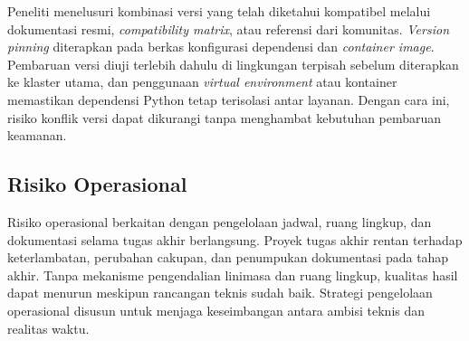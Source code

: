 \begin{enumerate}
\begin{enumerate}[label=\alph*)]
        Peneliti menelusuri kombinasi versi yang telah diketahui kompatibel melalui dokumentasi resmi, \textit{compatibility matrix}, atau referensi dari komunitas. \textit{Version pinning} diterapkan pada berkas konfigurasi dependensi dan \textit{container image}. Pembaruan versi diuji terlebih dahulu di lingkungan terpisah sebelum diterapkan ke klaster utama, dan penggunaan \textit{virtual environment} atau kontainer memastikan dependensi Python tetap terisolasi antar layanan. Dengan cara ini, risiko konflik versi dapat dikurangi tanpa menghambat kebutuhan pembaruan keamanan.
    \end{enumerate}
\end{enumerate}

\subsection{Risiko Operasional}

Risiko operasional berkaitan dengan pengelolaan jadwal, ruang lingkup, dan dokumentasi selama tugas akhir berlangsung. Proyek tugas akhir rentan terhadap keterlambatan, perubahan cakupan, dan penumpukan dokumentasi pada tahap akhir. Tanpa mekanisme pengendalian linimasa dan ruang lingkup, kualitas hasil dapat menurun meskipun rancangan teknis sudah baik. Strategi pengelolaan operasional disusun untuk menjaga keseimbangan antara ambisi teknis dan realitas waktu.

\vspace{0.5em}

